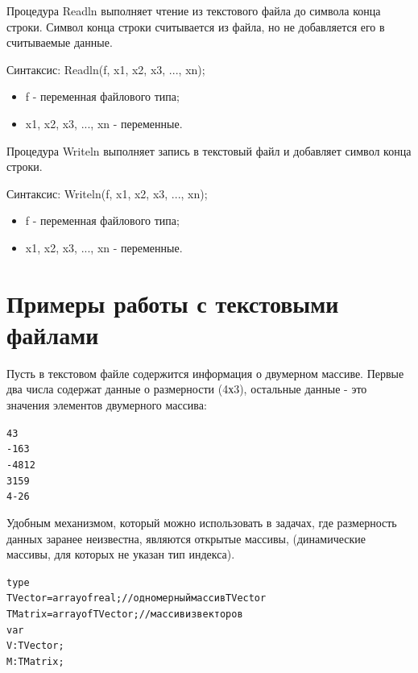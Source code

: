 \documentclass{beamer}
\begin{document}
\begin{frame}[fragile]
\begin{block}{Процедура Readln}
выполняет чтение из текстового файла до символа конца строки. Символ конца строки считывается из файла, но не добавляется его в считываемые данные.
\end{block}
Синтаксис: Readln(f, x1, x2, x3, $...$, xn);
\begin{itemize}
\item f - переменная файлового типа;
\item x1, x2, x3, $...$, xn - переменные.
\end{itemize}
\begin{block}{Процедура Writeln}
выполняет запись в текстовый файл и добавляет символ конца строки.
\end{block}
Синтаксис: Writeln(f, x1, x2, x3, $...$, xn);
\begin{itemize}
\item f - переменная файлового типа;
\item x1, x2, x3, $...$, xn - переменные.
\end{itemize}
\end{frame}

\section{Примеры работы с текстовыми файлами}
\begin{frame}
  \tableofcontents[currentsection]
\end{frame}

\begin{frame}[fragile]
Пусть в текстовом файле содержится информация о двумерном массиве. Первые два числа содержат данные о размерности (4х3), остальные данные - это значения элементов двумерного массива:
\begin{alltt}
4 3
-1 6 3 
-4 8 12 
3 15 9
4 -2 6
\end{alltt}
Удобным механизмом, который можно использовать в задачах, где размерность данных заранее неизвестна, являются открытые массивы, (динамические массивы, для которых не указан тип индекса). 
\begin{alltt}
type
  TVector = array of real; //одномерный массив TVector
  TMatrix = array of TVector; //массив из векторов
var
  V: TVector;
  M: TMatrix;
\end{alltt}
\end{frame}
\end{document}
